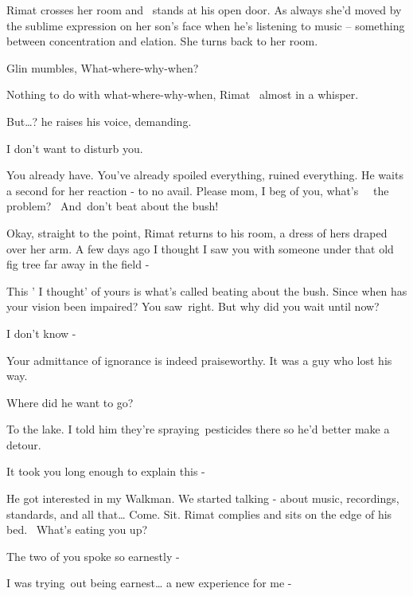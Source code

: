 \documentclass[12pt]{book}
\begin{document}
Rimat crosses her room and \ stands at his open door. As always she'd moved by the sublime expression on her son's face
when he's listening to music -- something between concentration and elation. She turns back to her room.

Glin mumbles, {\textquotedbl}What-where-why-when?{\textquotedbl}

{\textquotedbl}Nothing to do with what-where-why-when,{\textquotedbl} Rimat \ almost in a whisper.

{\textquotedbl}But{\dots}?{\textquotedbl} he raises his voice, demanding.

{\textquotedbl}I don't want to disturb you.{\textquotedbl}

{\textquotedbl}You already have. You've already spoiled everything, ruined everything.{\textquotedbl} He waits a second
for her reaction - to no avail. {\textquotedbl}Please mom, I beg of you, what's \ \ the problem? \ And~don't beat about
the bush!{\textquotedbl}

{\textquotedbl}Okay, straight to the point,{\textquotedbl} Rimat returns to his room, a dress of hers draped over her
arm. {\textquotedbl}A few days ago I thought I saw you with someone under that old fig tree far away in the field
-{\textquotedbl}

{\textquotedbl}This ' I thought' of yours is what's called beating about the bush. Since when has your vision been
impaired? You saw~right. But why did you wait until now?{\textquotedbl}

{\textquotedbl}I don't know -{\textquotedbl}

{\textquotedbl}Your admittance of ignorance is indeed praiseworthy. It was a guy who lost his way.{\textquotedbl}

{\textquotedbl}Where did he want to go?{\textquotedbl}

{\textquotedbl}To the lake. I told him they're spraying~pesticides there so he'd better make a detour.{\textquotedbl}

{\textquotedbl}It took you long enough to explain this -{\textquotedbl}

{\textquotedbl}He got interested in my Walkman. We started talking - about music, recordings, standards, and all
that{\dots} Come. Sit.{\textquotedbl} Rimat complies and sits on the edge of his bed.~ {\textquotedbl}What's eating you
up?{\textquotedbl}

{\textquotedbl}The two of you spoke so earnestly -{\textquotedbl}

{\textquotedbl}I was trying~out being earnest{\dots} a new experience for me -{\textquotedbl}
\end{document}
